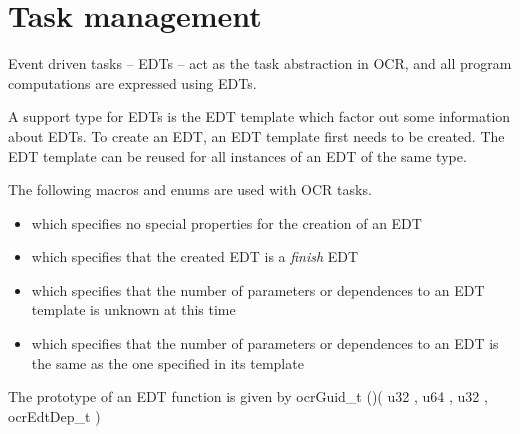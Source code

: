 \section{Task management}
\label{sec:OCRTaskManagement}

Event driven tasks -- EDTs -- act as the task abstraction in OCR, and all
program computations are expressed using E\-D\-Ts.

A support type for EDTs is the EDT template which factor out some information
about EDTs. To create an EDT, an EDT template first needs to be created. The EDT
template can be reused for all instances of an EDT of the same type.

The following macros and enums are used with OCR tasks.
\begin{itemize}
\item {} which specifies no special properties
  for the creation of an EDT
\item {} which specifies that the created EDT
  is a \emph{finish} EDT
\item {} which specifies that the number of
  parameters or dependences to an EDT template is unknown at this time
\item {} which specifies that the number of parameters
  or dependences to an EDT is the same as the one specified in its template
\end{itemize}

The prototype of an EDT function is given by
\hypertarget{type_ocrEdt_t}{
  \hypertarget{type_ocrGuid_t}{ocrGuid\_t} ()(
  \hypertarget{type_u32}{u32} , \hypertarget{type_u64}{u64} ,
  \hypertarget{type_u32}{u32} , \hypertarget{type_ocrEdtDep_t}
              {ocrEdtDep\_t} )}

